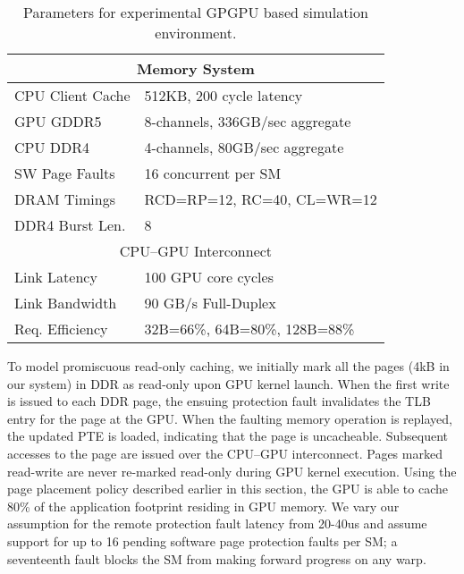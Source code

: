 \begin{table}[t]
\begin{center}
\begin{tabular}{|l|l|}
\hline
\multicolumn{2}{|c|}{Memory System}\\
\hline
CPU Client Cache & 512KB, 200 cycle latency\\
\hline
GPU GDDR5 & 8-channels, 336GB/sec aggregate\\
\hline
CPU DDR4& 4-channels, 80GB/sec aggregate\\
\hline
SW Page Faults& 16 concurrent per SM\\
\hline
DRAM Timings & \multicolumn{1}{|l|}{RCD=RP=12, RC=40, CL=WR=12}\\
\hline
DDR4 Burst Len.& 8\\
\hline
\hline
\multicolumn{2}{|c|}{CPU--GPU Interconnect}\\
\hline
Link Latency& 100 GPU core cycles\\
\hline
Link Bandwidth& 90 GB/s Full-Duplex\\
\hline
Req. Efficiency& 32B=66\%, 64B=80\%, 128B=88\%\\
\hline
\end{tabular}
\caption{Parameters for experimental GPGPU based simulation environment.}
\label{tab:methodology}
\end{center}
\vspace{-.1in}
\end{table}

To model promiscuous read-only caching, we initially mark all the pages (4kB in
our system) in DDR as read-only upon GPU kernel launch. When the first write is
issued to each DDR page, the ensuing protection fault invalidates the TLB entry
for the page at the GPU.  When the faulting memory operation is replayed, the
updated PTE is loaded, indicating that the page is uncacheable.  Subsequent
accesses to the page are issued over the CPU--GPU interconnect.  Pages marked
read-write are never re-marked read-only during GPU kernel execution. Using the
page placement policy described earlier in this section, the GPU is able to
cache 80\% of the application footprint residing in GPU memory. We vary our
assumption for the remote protection fault latency from 20-40us and assume
support for up to 16 pending software page protection faults per SM; a
seventeenth fault blocks the SM from making forward progress on any warp.

